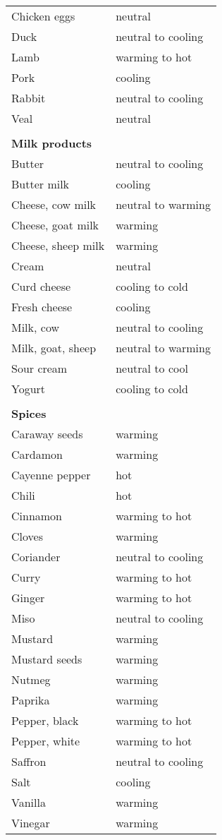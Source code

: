 \documentclass[../main.tex]{subfiles}
\begin{document}
\begin{longtable}{ll}
Chicken eggs  & neutral  \\
Duck & neutral to cooling \\
Lamb & warming to hot \\
Pork & cooling \\
Rabbit & neutral to cooling \\
Veal & neutral   \\
 \\
\multicolumn{2}{l}{\textbf{Milk products}} \\
Butter & neutral to cooling \\
Butter milk & cooling \\
Cheese, cow milk & neutral to warming \\
Cheese, goat milk & warming \\
Cheese, sheep milk & warming \\
Cream & neutral \\
Curd cheese & cooling to cold \\
Fresh cheese & cooling \\
Milk, cow & neutral to cooling \\
Milk, goat, sheep & neutral to warming \\
Sour cream & neutral to cool \\
Yogurt & cooling to cold \\
 \\
\multicolumn{2}{l}{\textbf{Spices}} \\
Caraway seeds & warming  \\
Cardamon & warming  \\
Cayenne pepper & hot \\
Chili & hot \\
Cinnamon & warming to hot \\
Cloves & warming \\
Coriander & neutral to cooling \\
Curry & warming to hot \\
Ginger & warming to hot \\
Miso & neutral to cooling \\
Mustard   & warming \\
Mustard seeds & warming \\
Nutmeg & warming \\
Paprika & warming \\
Pepper, black & warming to hot \\
Pepper, white  & warming to hot \\
Saffron & neutral to cooling \\
Salt & cooling \\
Vanilla & warming \\
Vinegar & warming \\
\bottomrule 
\end{longtable} 
 
\end{document}
